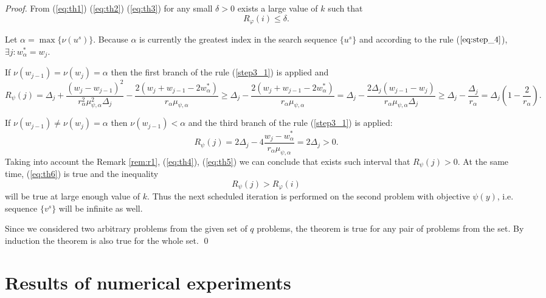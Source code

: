 \documentclass[runningheads]{llncs}
\begin{document}
\begin{proof}
  From (\ref{eq:th1}) (\ref{eq:th2}) (\ref{eq:th3}) for any small \(\delta > 0\) exists a large value of \(k\) such that
  \begin{equation}
    R_\varphi(i)\leqslant \delta.
    \label{eq:th6}
  \end{equation}

  Let \(\alpha = \max\{\nu(u^s)\}\). Because \(\alpha\) is currently the greatest index
  in the search sequence \(\{u^s\}\) and according to the rule (\(\ref{eq:step_4}\)), \(\exists j: w^*_\alpha=w_j\).

  If \(\nu(w_{j-1})=\nu(w_{j})=\alpha\) then the first branch of the rule (\ref{step3_1}) is applied and
  \begin{dmath}
    R_\psi(j)=\Delta_j + \frac{(w_j-w_{j-1})^2}{r_\alpha^2\mu_{\psi,\alpha}^2\Delta_j}
      - \frac{2(w_j+w_{j-1}-2w^*_\alpha)}{r_\alpha\mu_{\psi,\alpha}} \geqslant
      \Delta_j - \frac{2(w_j+w_{j-1}-2w^*_\alpha)}{r_\alpha\mu_{\psi,\alpha}} =
      \Delta_j - \frac{2\Delta_j(w_{j-1}-w_j)}{r_\alpha\mu_{\psi,\alpha}\Delta_j} \geqslant
      \Delta_j - \frac{\Delta_j}{r_\alpha} = \Delta_j\left(1-\frac{2}{r_\alpha}\right).
    \label{eq:th4}
  \end{dmath}

  If \(\nu(w_{j-1})\ne\nu(w_{j})=\alpha\) then \(\nu(w_{j-1})<\alpha\) and the third branch of
  the rule (\ref{step3_1}) is applied:
  \begin{equation}
    R_\psi(j)=2\Delta_j - 4 \frac{w_j-w^*_{\alpha}}{r_\alpha \mu_{\psi,\alpha}}=2\Delta_j > 0.
    \label{eq:th5}
  \end{equation}
  Taking into account the Remark \ref{rem:r1}, (\ref{eq:th4}), (\ref{eq:th5}) we can conclude that
  exists such interval that \(R_\psi(j)>0\). At the same time, (\ref{eq:th6}) is true and
  the inequality
  \begin{displaymath}
    R_\psi(j) > R_\varphi(i)
  \end{displaymath}
  will be true at large enough value of \(k\). Thus the next scheduled iteration is performed on
  the second problem with objective \(\psi(y)\), i.e. sequence \(\{v^s\}\) will be infinite as well.

  Since we considered two arbitrary problems from the given set of \(q\) problems, the theorem is
  true for any pair of problems from the set. By induction the theorem is also true for the whole
  set.
\qed
\end{proof}

\section{Results of numerical experiments}
\label{sec:exps}
\end{document}
